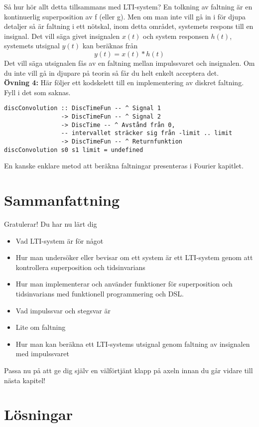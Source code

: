\documentclass{article}
\begin{document}
Så hur hör allt detta tillsammans med LTI-system? En tolkning av faltning
är en kontinuerlig superposition av f (eller g). Men om man inte vill gå in
i för djupa detaljer så är faltning i ett nötskal, inom detta området,
systemets respons till en insignal. Det vill säga givet insignalen $x(t)$
och system responsen $h(t)$, systemets utsignal $y(t)$ kan beräknas från
$$y(t) = x(t) * h(t) $$
Det vill säga utsignalen fås av en faltning mellan impulssvaret och insignalen. Om du inte vill gå in djupare på teorin så får du helt enkelt acceptera det.
\\

\textbf{Övning 4:}
Här följer ett kodskelett till en implementering av diskret faltning. Fyll i det som saknas.
\begin{verbatim}
discConvolution :: DiscTimeFun -- ^ Signal 1
                -> DiscTimeFun -- ^ Signal 2
                -> DiscTime -- ^ Avstånd från 0,
                -- intervallet sträcker sig från -limit .. limit
                -> DiscTimeFun -- ^ Returnfunktion
discConvolution s0 s1 limit = undefined
\end{verbatim}
En kanske enklare metod att beräkna faltningar presenteras i Fourier kapitlet.
\newpage

\section{Sammanfattning}
Gratulerar! Du har nu lärt dig
\begin{itemize}
\item Vad LTI-system är för något
\item Hur man undersöker eller bevisar om ett system är ett LTI-system genom att kontrollera superposition och tidsinvarians 
\item Hur man implementerar och använder funktioner för superposition och tidsinvarians med funktionell programmering och DSL.
\item Vad impulssvar och stegsvar är
\item Lite om faltning 
\item Hur man kan beräkna ett LTI-systems utsignal genom faltning av insignalen med impulssvaret
\end{itemize}
Passa nu på att ge dig själv en välförtjänt klapp på axeln innan du går vidare till nästa kapitel!


\section{Lösningar}
\end{document}
